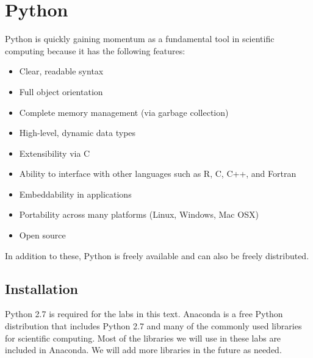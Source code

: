 \label{lab:Essential_Python}



\section*{Python}
Python is quickly gaining momentum as a fundamental tool in scientific computing because it has the following features:
\begin{itemize}
\item Clear, readable syntax
\item Full object orientation
\item Complete memory management (via garbage collection)
\item High-level, dynamic data types
\item Extensibility via C
\item Ability to interface with other languages such as R, C, C++, and Fortran
\item Embeddability in applications
\item Portability across many platforms (Linux, Windows, Mac OSX)
\item Open source
\end{itemize}
In addition to these, Python is freely available and can also be freely distributed.

\subsection*{Installation}
Python 2.7 is required for the labs in this text.
Anaconda is a free Python distribution that includes Python 2.7 and many of the commonly used libraries for scientific computing. 
Most of the libraries we will use in these labs are included in Anaconda.
We will add more libraries in the future as needed.

